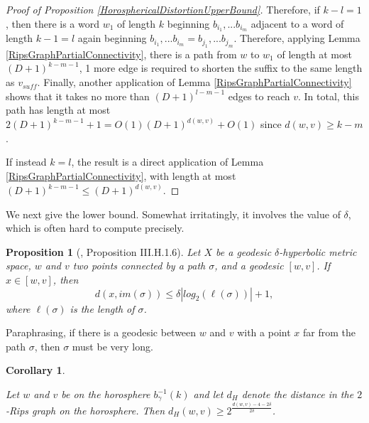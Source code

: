 \documentclass{amsart}
\newtheorem{corollary}[theorem]{Corollary}
\newtheorem{proposition}[theorem]{Proposition}
\theoremstyle{definition}
\theoremstyle{remark}
\begin{document}
\begin{proof} [Proof of Proposition \ref{HorosphericalDistortionUpperBound}]
		Therefore, if $k-l=1$, then there is a word $w_1$ of length $k$ beginning $b_{i_1}, ... b_{i_m}$ adjacent to a word of length $k-1=l$ again beginning $b_{i_1}, ... b_{i_m}= b_{j_1}, ... b_{j_m}$. Therefore, applying Lemma \ref{RipsGraphPartialConnectivity}, there is a path from $w$ to $w_1$ of length at most $(D+1)^{k-m-1}$, 1 more edge is required to shorten the suffix to the same length as $v_{suff}$. Finally, another application of Lemma \ref{RipsGraphPartialConnectivity} shows that it takes no more than $(D+1)^{l-m-1}$ edges to reach $v$. In total, this path has length at most $2(D+1)^{k-m-1}+1=O(1)(D+1)^{d(w,v)}+O(1)$ since $d(w,v)\ge k-m$.
		
		If instead $k=l$, the result is a direct application of Lemma \ref{RipsGraphPartialConnectivity}, with length at most $(D+1)^{k-m-1}\le (D+1)^{d(w,v)}$.		
	\end{proof}
	
	We next give the lower bound. Somewhat irritatingly, it involves the value of $\delta$, which is often hard to compute precisely.
	
	\begin{proposition}[\cite{BridsonHaefliger}, Proposition III.H.1.6]
		
		Let $X$ be a geodesic $\delta$-hyperbolic metric space, $w$ and $v$ two points connected by a path $\sigma$, and a geodesic $[w,v]$. If $x\in[w,v]$, then 
        $$d(x, im(\sigma))\le \delta |log_{2}(\ell(\sigma))|+1,$$
        where $\ell(\sigma)$ is the length of $\sigma$.
		
	\end{proposition}
	
	Paraphrasing, if there is a geodesic between $w$ and $v$ with a point $x$ far from the path $\sigma$, then $\sigma$ must be very long.
	
	\begin{corollary} \label{HorosphericalDistortionLowerBound}
		
		Let $w$ and $v$ be on the horosphere $b_{\gamma}^{-1}(k)$ and let $d_H$ denote the distance in the $2$-Rips graph on the horosphere. Then $d_H(w, v)\ge 2^{\frac{d(w, v)-4-2\delta}{2\delta}}$.
		
	\end{corollary}
	
\end{document}
